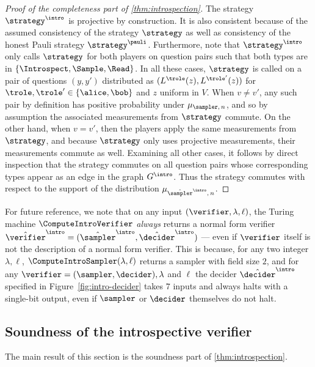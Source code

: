 \begin{proof}[Proof of the completeness part of \cref{thm:introspection}]
The strategy $\strategy^\intro$ is projective by construction.
It is also consistent because of the assumed consistency of the strategy
$\strategy$ as well as consistency of the honest Pauli strategy $\strategy^\pauli$.
Furthermore, note that $\strategy^\intro$ only calls $\strategy$ for both
players on question pairs such that both types are in
$\{\Introspect,\Sample,\Read\}$.
In all these cases, $\strategy$ is called on a pair of questions $(y,y')$
distributed as $(L^\trole(z),L^{\trole'}(z))$ for
$\trole,\trole'\in\{\alice,\bob\}$ and $z$ uniform in $V$.
When $v \neq v'$, any such pair by definition has positive probability under
$\mu_{\sampler,\, n}$, and so by assumption the associated measurements from
$\strategy$ commute.
On the other hand, when $v = v'$, then the players apply the same measurements
from $\strategy$, and because $\strategy$ only uses projective measurements,
their measurements commute as well.
Examining all other cases, it follows by direct inspection that the strategy
commutes on all question pairs whose corresponding types appear as an edge in
the graph $G^\intro$.
Thus the strategy commutes with respect to the support of the distribution
$\mu_{\tsint,\, n}$.
\end{proof}

\begin{remark}\label{rk:intro-normalform}
  For future reference, we note that on any input $(\verifier, \lambda, \ell)$,
the Turing machine $\ComputeIntroVerifier$ \emph{always} returns a normal form verifier $\tvint =
  (\tsint,\tdint)$ --- even if $\verifier$ itself is not the description of a normal form verifier. 
  This is because, for any two integer $\lambda,\ell$,
  $\ComputeIntroSampler(\lambda,\ell)$ returns a sampler with field size $2$,
  and for any $\verifier = (\sampler,\decider), \lambda$ and $\ell$ the decider $\tdint$ specified in
  Figure~\ref{fig:intro-decider} takes $7$ inputs and always halts with a
  single-bit output, even if $\sampler$ or $\decider$ themselves do not halt.
\end{remark}

\subsection{Soundness of the introspective verifier}
\label{sec:intro-soundness}

The main result of this section is the soundness part of
\cref{thm:introspection}.





